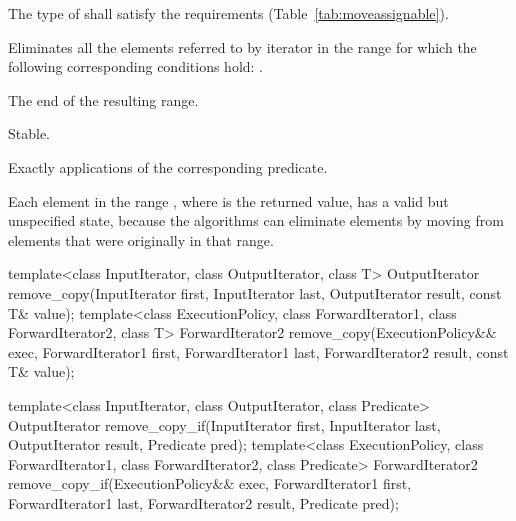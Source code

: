 \begin{itemdescr}
\pnum
\requires
The type of
shall satisfy the 
requirements (Table~\ref{tab:moveassignable}).

\pnum
\effects
Eliminates all the elements referred to by iterator
in the range 
for which the following corresponding conditions hold:
.

\pnum
\returns
The end of the resulting range.

\pnum
\remarks Stable.

\pnum
\complexity
Exactly
applications of the corresponding predicate.

\pnum
\begin{note}
Each element in the range , where  is
the returned value, has a valid but unspecified state, because the algorithms
can eliminate elements by moving from elements that were originally
in that range.
\end{note}
\end{itemdescr}

%
%
\begin{itemdecl}
template<class InputIterator, class OutputIterator, class T>
  OutputIterator
    remove_copy(InputIterator first, InputIterator last,
                OutputIterator result, const T& value);
template<class ExecutionPolicy, class ForwardIterator1, class ForwardIterator2, class T>
  ForwardIterator2
    remove_copy(ExecutionPolicy&& exec,
                ForwardIterator1 first, ForwardIterator1 last,
                ForwardIterator2 result, const T& value);

template<class InputIterator, class OutputIterator, class Predicate>
  OutputIterator
    remove_copy_if(InputIterator first, InputIterator last,
                   OutputIterator result, Predicate pred);
template<class ExecutionPolicy, class ForwardIterator1, class ForwardIterator2, class Predicate>
  ForwardIterator2
    remove_copy_if(ExecutionPolicy&& exec,
                   ForwardIterator1 first, ForwardIterator1 last,
                   ForwardIterator2 result, Predicate pred);
\end{itemdecl}

